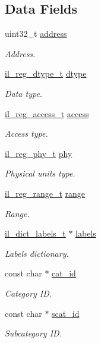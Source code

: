 \subsection*{Data Fields}
\begin{DoxyCompactItemize}
\item 
uint32\+\_\+t \hyperlink{structil__reg__t_ac0433a8ae86e0990fa59a074a5ad1bd1}{address}
\begin{DoxyCompactList}\small\item\em Address. \end{DoxyCompactList}\item 
\hyperlink{group__IL__REGS_gaddd7edef254d348f2e8a48c40840cdd6}{il\+\_\+reg\+\_\+dtype\+\_\+t} \hyperlink{structil__reg__t_a1780caa197277828816c7214aa7b5d2f}{dtype}
\begin{DoxyCompactList}\small\item\em Data type. \end{DoxyCompactList}\item 
\hyperlink{group__IL__REGS_ga4c623bd7d0d5f059dd91949c6948147e}{il\+\_\+reg\+\_\+access\+\_\+t} \hyperlink{structil__reg__t_a8cd718765e48f0de2f978de386c61218}{access}
\begin{DoxyCompactList}\small\item\em Access type. \end{DoxyCompactList}\item 
\hyperlink{group__IL__REGS_ga37538453e5c3d84733c628987a579590}{il\+\_\+reg\+\_\+phy\+\_\+t} \hyperlink{structil__reg__t_a799847eb04e4f29073e7c9939ae977df}{phy}
\begin{DoxyCompactList}\small\item\em Physical units type. \end{DoxyCompactList}\item 
\hyperlink{structil__reg__range__t}{il\+\_\+reg\+\_\+range\+\_\+t} \hyperlink{structil__reg__t_acb9979e9f542ec4b683a6b2b603d4bea}{range}
\begin{DoxyCompactList}\small\item\em Range. \end{DoxyCompactList}\item 
\hyperlink{group__IL__DICT__LABELS_ga69d1109256f465cbcfa8aac7fa592495}{il\+\_\+dict\+\_\+labels\+\_\+t} $\ast$ \hyperlink{structil__reg__t_a6d86137472a9c21c1c364f05c58b943b}{labels}
\begin{DoxyCompactList}\small\item\em Labels dictionary. \end{DoxyCompactList}\item 
const char $\ast$ \hyperlink{structil__reg__t_a9306d321ecedb9559d7dd339c6115b78}{cat\+\_\+id}
\begin{DoxyCompactList}\small\item\em Category ID. \end{DoxyCompactList}\item 
const char $\ast$ \hyperlink{structil__reg__t_a827bdfd4438dc720a322ec17c17afe2f}{scat\+\_\+id}
\begin{DoxyCompactList}\small\item\em Subcategory ID. \end{DoxyCompactList}\end{DoxyCompactItemize}


